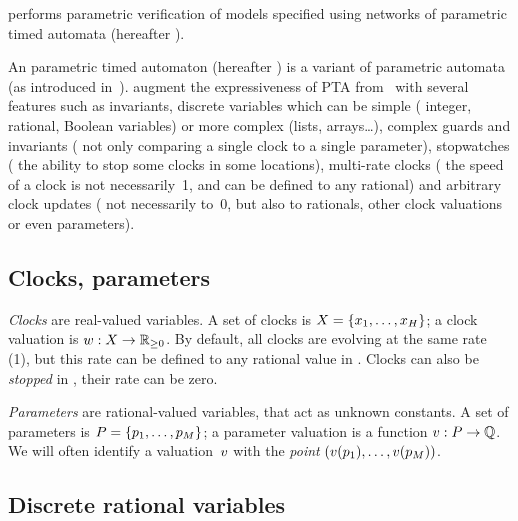 \imitator{} performs parametric verification of models specified using networks of \imitator{} parametric timed automata (hereafter \NIPTA{}).

An \imitator{} parametric timed automaton (hereafter \IPTA{}) is a variant of parametric automata (as introduced in~\cite{AHV93}).
\IPTA{} augment the expressiveness of PTA from~\cite{AHV93} with several features such as invariants, discrete variables which can be simple (\eg{} integer, rational, Boolean variables) or more complex (lists, arrays…), complex guards and invariants (\ie{} not only comparing a single clock to a single parameter), stopwatches (\ie{} the ability to stop some clocks in some locations), multi-rate clocks (\ie{} the speed of a clock is not necessarily~1, and can be defined to any rational) and arbitrary clock updates (\ie{} not necessarily to~0, but also to rationals, other clock valuations or even parameters).


\subsection{Clocks, parameters}

\emph{Clocks} are real-valued variables.
A set of clocks is $X = \{ x_1, \dots, x_H \}$;
a clock valuation is
$w : X \rightarrow \mathbb R_{\geq 0}$.
By default, all clocks are evolving at the same rate (1), but this rate can be defined to any rational value in \imitator{}.
Clocks can also be \emph{stopped} in \imitator{}, \ie{} their rate can be zero.

\emph{Parameters} are rational-valued variables, that act as unknown constants.
A set of parameters is $P = \{ p_1, \dots, p_M \} $;
a parameter valuation is a function $v : P \rightarrow \mathbb Q$.
We will often identify a valuation~$v$ with the \emph{point} $(v(p_1), \dots, v(p_{M}))$.


\subsection{Discrete rational variables}\label{subsection:rational}

